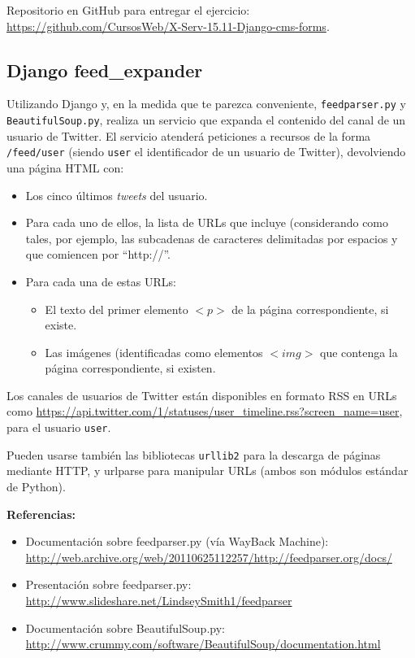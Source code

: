 Repositorio en GitHub para entregar el ejercicio: \\ 
\url{https://github.com/CursosWeb/X-Serv-15.11-Django-cms-forms}.


\subsection{Django feed\_expander}
\label{subsec:django-feed-expander}

Utilizando Django y, en la medida que te parezca conveniente, \texttt{feedparser.py} y \texttt{BeautifulSoup.py}, realiza un servicio que expanda el contenido del canal de un usuario de Twitter. El servicio atenderá peticiones a recursos de la forma \verb|/feed/user| (siendo  \texttt{user} el identificador de un usuario de Twitter), devolviendo una página HTML con:

\begin{itemize}
\item Los cinco últimos \emph{tweets} del usuario.
\item Para cada uno de ellos, la lista de URLs que incluye (considerando como tales, por ejemplo, las subcadenas de caracteres delimitadas por espacios y que comiencen por ``http://''.
\item Para cada una de estas URLs:
  \begin{itemize}
  \item El texto del primer elemento $<p>$ de la página correspondiente, si existe.
  \item Las imágenes (identificadas como elementos $<img>$ que contenga la página correspondiente, si existen.
  \end{itemize}
\end{itemize}

Los canales de usuarios de Twitter están disponibles en formato RSS en URLs como \url{https://api.twitter.com/1/statuses/user_timeline.rss?screen_name=user}, para el usuario \texttt{user}.

Pueden usarse también las bibliotecas \texttt{urllib2} para la descarga de páginas mediante HTTP, y urlparse para manipular URLs (ambos son módulos estándar de Python).

\textbf{Referencias:}

\begin{itemize}
\item Documentación sobre feedparser.py (vía WayBack Machine): \\
  \url{http://web.archive.org/web/20110625112257/http://feedparser.org/docs/}
\item Presentación sobre feedparser.py: \\
  \url{http://www.slideshare.net/LindseySmith1/feedparser}
\item Documentación sobre BeautifulSoup.py: \\
  \url{http://www.crummy.com/software/BeautifulSoup/documentation.html}
\end{itemize}

